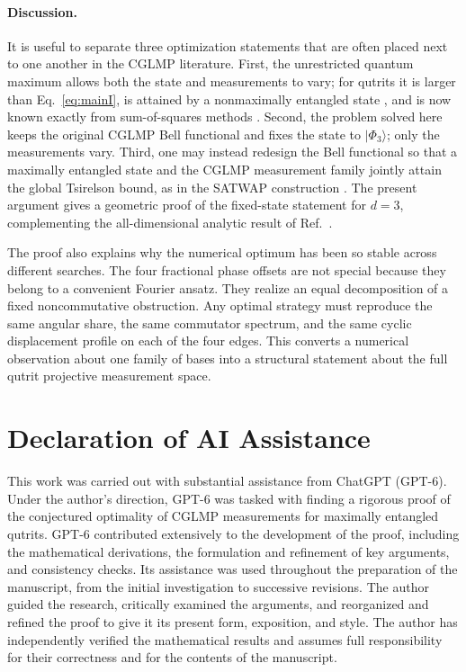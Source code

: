 \documentclass[aps,prl,reprint,superscriptaddress,nofootinbib]{revtex4-2}
\newcommand{\Phithree}{\lvert\Phi_3\rangle}
\begin{document}
\paragraph{Discussion.}
It is useful to separate three optimization statements that are often placed next to one another in the CGLMP literature. First, the unrestricted quantum maximum allows both the state and measurements to vary; for qutrits it is larger than Eq.~\eqref{eq:mainI}, is attained by a nonmaximally entangled state \cite{Acin2002}, and is now known exactly from sum-of-squares methods \cite{IoannouRosset}. Second, the problem solved here keeps the original CGLMP Bell functional and fixes the state to $\Phithree$; only the measurements vary. Third, one may instead redesign the Bell functional so that a maximally entangled state and the CGLMP measurement family jointly attain the global Tsirelson bound, as in the SATWAP construction \cite{SATWAP,Sarkar}. The present argument gives a geometric proof of the fixed-state statement for $d=3$, complementing the all-dimensional analytic result of Ref.~\cite{TurtureanBao}.

The proof also explains why the numerical optimum has been so stable across different searches. The four fractional phase offsets are not special because they belong to a convenient Fourier ansatz. They realize an equal decomposition of a fixed noncommutative obstruction. Any optimal strategy must reproduce the same angular share, the same commutator spectrum, and the same cyclic displacement profile on each of the four edges. This converts a numerical observation about one family of bases into a structural statement about the full qutrit projective measurement space.



\section*{Declaration of AI Assistance}

This work was carried out with substantial assistance from
ChatGPT (GPT-6). Under the author's direction, GPT-6 was
tasked with finding a rigorous proof of the conjectured
optimality of CGLMP measurements for maximally entangled
qutrits. GPT-6 contributed extensively to the development
of the proof, including the mathematical derivations,
the formulation and refinement of key arguments, and
consistency checks. Its assistance was used throughout
the preparation of the manuscript, from the initial
investigation to successive revisions. The author guided
the research, critically examined the arguments, and
reorganized and refined the proof to give it its present
form, exposition, and style. The author has independently
verified the mathematical results and assumes full
responsibility for their correctness and for the
contents of the manuscript.
\end{document}
